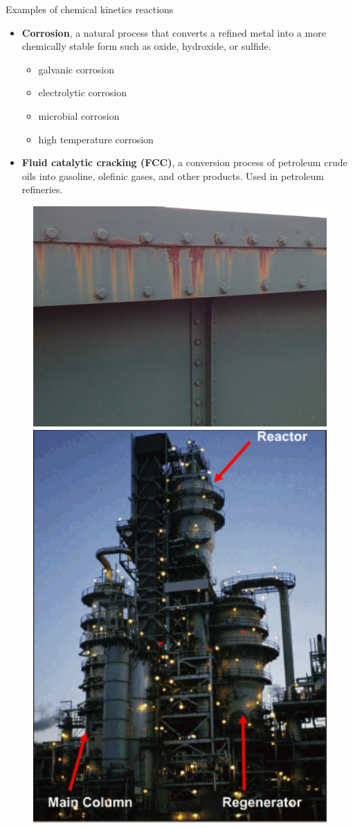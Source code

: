 
\begin{frame}{Examples of chemical kinetics reactions}
%
\lcol

\begin{itemize}
	\item \alert{\textbf{Corrosion}}, a natural process that converts a refined metal into a more chemically stable form such as oxide, hydroxide, or sulfide.
		\begin{itemize}
		\item galvanic corrosion 
		\item electrolytic corrosion
		\item microbial corrosion
		\item high temperature corrosion
	\end{itemize}
	\pause
	\item \alert{\textbf{Fluid catalytic cracking (FCC)}}, a conversion process of petroleum crude oils into gasoline, olefinic gases, and other products. Used in petroleum refineries.
\end{itemize}      

\rcol

\begin{figure}
\centering
\includegraphics[width=0.49\columnwidth]{figures/applications/corrosion.jpg} \\[5pt]
\includegraphics[width=0.49\columnwidth]{figures/applications/fluid-catalytic-cracker}
\end{figure}

\ecol

\end{frame}
